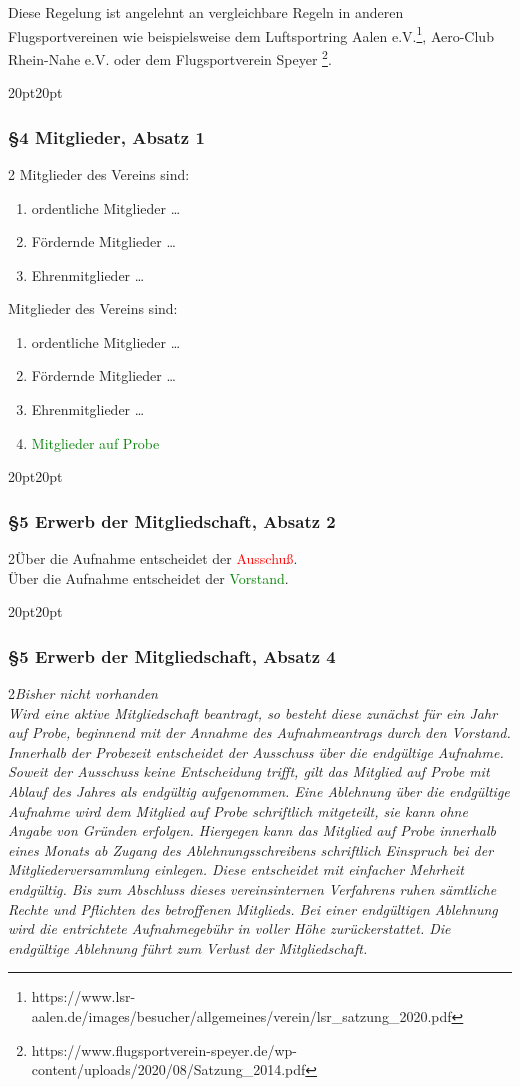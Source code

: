 \documentclass[10pt,a4paper,parskip=half]{scrartcl}
\newcommand{\new}[1]{\textcolor{Green}{#1}}
\newcommand{\old}[1]{\textcolor{Red}{#1}}
\newcommand{\change}[1]{
  \begin{adjustwidth}{20pt}{20pt}
    #1
  \end{adjustwidth}
}
\newcommand{\compare}[3]{\change{\subsubsection*{#1}\begin{multicols}{2}#2\columnbreak\\#3\end{multicols}}}
\begin{document}
Diese Regelung ist angelehnt an vergleichbare Regeln in anderen Flugsportvereinen wie beispielsweise dem Luftsportring Aalen e.V.\footnote{https://www.lsr-aalen.de/images/besucher/allgemeines/verein/lsr\_satzung\_2020.pdf}, Aero-Club Rhein-Nahe e.V. oder dem Flugsportverein Speyer \footnote{https://www.flugsportverein-speyer.de/wp-content/uploads/2020/08/Satzung\_2014.pdf}.

\change{
  \subsubsection*{§4 Mitglieder, Absatz 1}
  \begin{multicols}{2}
    Mitglieder des Vereins sind:
    \begin{enumerate}[noitemsep]
      \item ordentliche Mitglieder \dots
      \item Fördernde Mitglieder \dots
      \item Ehrenmitglieder \dots
    \end{enumerate}
    \columnbreak
    Mitglieder des Vereins sind:
    \begin{enumerate}[noitemsep]
      \item ordentliche Mitglieder \dots
      \item Fördernde Mitglieder \dots
      \item Ehrenmitglieder \dots
      \item \new{Mitglieder auf Probe}
    \end{enumerate}
  \end{multicols}
}

\compare{§5 Erwerb der Mitgliedschaft, Absatz 2}{Über die Aufnahme entscheidet der \old{Ausschuß}.}{Über die Aufnahme entscheidet der \new{Vorstand}.}
\clearpage
\compare{§5 Erwerb der Mitgliedschaft, Absatz 4}{\em Bisher nicht vorhanden \em}{Wird eine aktive Mitgliedschaft beantragt,
  so besteht diese zunächst für ein Jahr auf Probe,
  beginnend mit der Annahme des Aufnahmeantrags durch den Vorstand.
  Innerhalb der Probezeit entscheidet der Ausschuss über die endgültige Aufnahme.
  Soweit der Ausschuss keine Entscheidung trifft,
  gilt das Mitglied auf Probe mit Ablauf des Jahres als endgültig aufgenommen.
  Eine Ablehnung über die endgültige Aufnahme wird dem Mitglied auf Probe schriftlich mitgeteilt,
  sie kann ohne Angabe von Gründen erfolgen.
  Hiergegen kann das Mitglied auf Probe innerhalb eines Monats ab Zugang des Ablehnungsschreibens schriftlich Einspruch bei der Mitgliederversammlung einlegen.
  Diese entscheidet mit einfacher Mehrheit endgültig.
  Bis zum Abschluss dieses vereinsinternen Verfahrens ruhen sämtliche Rechte und Pflichten des betroffenen Mitglieds.
  Bei einer endgültigen Ablehnung wird die entrichtete Aufnahmegebühr in voller Höhe zurückerstattet.
  Die endgültige Ablehnung führt zum Verlust der Mitgliedschaft.}
\end{document}
